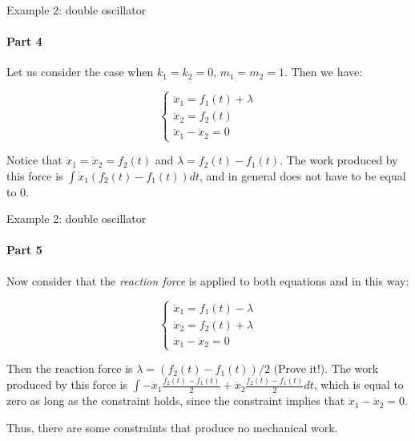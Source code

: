 \documentclass{beamer}
\begin{document}
\begin{frame}{Example 2: double oscillator}
\framesubtitle{Part 4}
\begin{flushleft}

Let us consider the case when $k_1 = k_2 = 0$, $m_1 = m_2 = 1$. Then we have:

\begin{equation}
\begin{cases}
    \ddot x_1 = f_1 (t) + \lambda \\
    \ddot x_2 = f_2 (t) \\
    \ddot x_1 - \ddot x_2 = 0
\end{cases}
\end{equation}

Notice that $\ddot x_1 = \ddot x_2 = f_2 (t)$ and $\lambda = f_2 (t) - f_1 (t)$. The work produced by this force is $\int \dot x_1 (f_2 (t) - f_1 (t)) dt$, and  in general does not have to be equal to 0.

\end{flushleft}
\end{frame}




\begin{frame}{Example 2: double oscillator}
\framesubtitle{Part 5}
\begin{flushleft}

Now consider that the \emph{reaction force} is applied to both equations and in this way:

\begin{equation}
\label{Example1}
\begin{cases}
    \ddot x_1 = f_1 (t) - \lambda \\
    \ddot x_2 = f_2 (t) + \lambda\\
    \ddot x_1 - \ddot x_2 = 0
\end{cases}
\end{equation}

Then the reaction force is $\lambda = (f_2 (t) - f_1 (t)) / 2$ (Prove it!). The work produced by this force is $\int -\dot x_1 \frac{f_2 (t) - f_1 (t)}{2} + \dot x_2 \frac{f_2 (t) - f_1 (t)}{2} dt$, which is equal to zero as long as the constraint holds, since the constraint implies that $\dot x_1 - \dot x_2 = 0$.

\bigskip

Thus, there are some constraints that produce no mechanical work.

\end{flushleft}
\end{frame}
\end{document}
